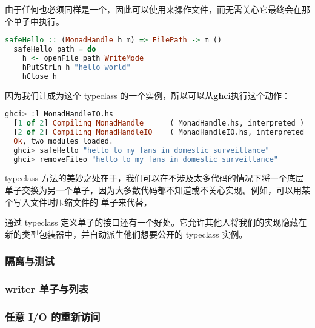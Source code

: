 \documentclass[./main.tex]{subfiles}
\begin{document}
由于任何也必须同样是一个，因此可以使用来操作文件，而无需关心它最终会在那个单子中执行。

\begin{lstlisting}[language=Haskell]
  safeHello :: (MonadHandle h m) => FilePath -> m ()
  safeHello path = do
    h <- openFile path WriteMode
    hPutStrLn h "hello world"
    hClose h
\end{lstlisting}

因为我们让成为这个 typeclass 的一个实例，所以可以从\textbf{ghci}执行这个动作：

\begin{lstlisting}[language=Haskell]
  ghci> :l MonadHandleIO.hs
  [1 of 2] Compiling MonadHandle      ( MonadHandle.hs, interpreted )
  [2 of 2] Compiling MonadHandleIO    ( MonadHandleIO.hs, interpreted )
  Ok, two modules loaded.
  ghci> safeHello "hello to my fans in domestic surveillance"
  ghci> removeFileo "hello to my fans in domestic surveillance"
\end{lstlisting}

typeclass 方法的美妙之处在于，我们可以在不涉及太多代码的情况下将一个底层单子交换为另一个单子，因为大多数代码都不知道或不关心实现。例如，可以用某个写入文件时压缩文件的
单子来代替，

通过 typeclass 定义单子的接口还有一个好处。它允许其他人将我们的实现隐藏在新的类型包装器中，并自动派生他们想要公开的 typeclass 实例。

\subsubsection*{隔离与测试}


\subsubsection*{writer 单子与列表}

\subsubsection*{任意 I/O 的重新访问}
\end{document}
